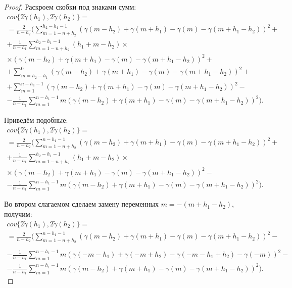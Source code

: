 \begin{proof}
Раскроем скобки под знаками сумм:
\begin{equation*}\begin{gathered}
	cov\{ 2 \tilde{\gamma}(h_1), 2 \tilde{\gamma}(h_2) \} = \\
	= \frac{2}{n - h_2} (\sum_{m = 1 - n + h_2}^{h_2 - h_1 - 1} (\gamma(m - h_2) + \gamma(m + h_1) - \gamma(m) - \gamma(m + h_1 - h_2))^2 + \\
	+ \frac{1}{n - h_1} \sum_{m = 1 - n + h_2}^{h_2 - h_1 - 1} (h_1 + m - h_2) \times \\
	\times (\gamma(m - h_2) + \gamma(m + h_1) - \gamma(m) - \gamma(m + h_1 - h_2))^2 + \\
	+ \sum_{m = h_2 - h_1}^{0}(\gamma(m - h_2) + \gamma(m + h_1) - \gamma(m) - \gamma(m + h_1 - h_2))^2 + \\
	+ \sum_{m = 1}^{n - h_1 - 1}(\gamma(m - h_2) + \gamma(m + h_1) - \gamma(m) - \gamma(m + h_1 - h_2))^2 - \\
	- \frac{1}{n - h_1} \sum_{m = 1}^{n - h_1 - 1} m (\gamma(m - h_2) + \gamma(m + h_1) - \gamma(m) - \gamma(m + h_1 - h_2))^2).
\end{gathered}\end{equation*}

Приведём подобные:
\begin{equation*}\begin{gathered}
	cov\{ 2 \tilde{\gamma}(h_1), 2 \tilde{\gamma}(h_2) \} = \\
	= \frac{2}{n - h_2} (\sum_{m = 1 - n + h_2}^{n - h_1 - 1} (\gamma(m - h_2) + \gamma(m + h_1) - \gamma(m) - \gamma(m + h_1 - h_2))^2 + \\
	+ \frac{1}{n - h_1} \sum_{m = 1 - n + h_2}^{h_2 - h_1 - 1} (h_1 + m - h_2) \times \\
	\times (\gamma(m - h_2) + \gamma(m + h_1) - \gamma(m) - \gamma(m + h_1 - h_2))^2 - \\
	- \frac{1}{n - h_1} \sum_{m = 1}^{n - h_1 - 1} m (\gamma(m - h_2) + \gamma(m + h_1) - \gamma(m) - \gamma(m + h_1 - h_2))^2).
\end{gathered}\end{equation*}

Во втором слагаемом сделаем замену переменных $ m = -(m + h_1 - h_2) $, получим:
\begin{equation*}\begin{gathered}
	cov\{ 2 \tilde{\gamma}(h_1), 2 \tilde{\gamma}(h_2) \} = \\
	= \frac{2}{n - h_2} (\sum_{m = 1 - n + h_2}^{n - h_1 - 1} (\gamma(m - h_2) + \gamma(m + h_1) - \gamma(m) - \gamma(m + h_1 - h_2))^2 - \\
\end{gathered}\end{equation*}
\begin{equation*}\begin{gathered}
	- \frac{1}{n - h_1} \sum_{m = 1}^{n - h_1 - 1} m (\gamma(-m - h_1) + \gamma(-m + h_2) - \gamma(-m - h_1 + h_2) - \gamma(-m))^2 - \\
	- \frac{1}{n - h_1} \sum_{m = 1}^{n - h_1 - 1} m (\gamma(m - h_2) + \gamma(m + h_1) - \gamma(m) - \gamma(m + h_1 - h_2))^2).
\end{gathered}\end{equation*}


\end{proof}

